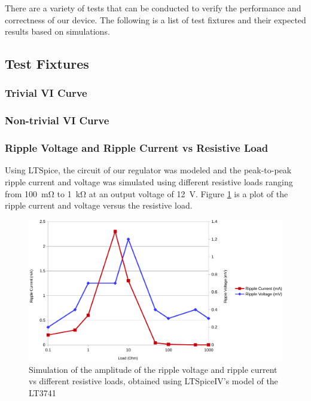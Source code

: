 There are a variety of tests that can be conducted to verify the performance and
correctness of our  device.  The  following is a list of test fixtures and their
expected results based on simulations.

\subsection{Test Fixtures}

\subsubsection{Trivial VI Curve}


\subsubsection{Non-trivial VI Curve}


\subsubsection{Ripple Voltage and Ripple Current vs Resistive Load}

Using LTSpice\cite{ref:ltspice}, the circuit  of  our  regulator was modeled and
the  peak-to-peak  ripple  current  and  voltage  was  simulated using different
resistive  loads ranging from \SI{100}{\milli\ohm} to  \SI{1}{\kilo\ohm}  at  an
output  voltage of \SI{12}{\volt}. Figure \ref{fig:verification:ripple_sim} is a
plot  of  the   ripple   current   and   voltage   versus  the  resistive  load.

\begin{figure}[th!]
    \centering
    \includegraphics[width=.7\textwidth]{images/sim/ripple-vs-load.pdf}
    \caption{Simulation of the amplitude of the ripple voltage and ripple current vs different resistive loads, obtained using LTSpiceIV's model of the LT3741}
    \label{fig:verification:ripple_sim}
\end{figure}

